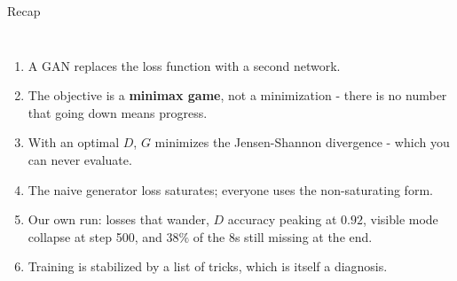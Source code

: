 \documentclass[aspectratio=169]{beamer}
\begin{document}
\begin{frame}{Recap}
  \small
  \begin{columns}[T]
    \begin{enumerate}\setlength\itemsep{2pt}
      \item A GAN replaces the loss function with a second network.
      \item The objective is a \textbf{minimax game}, not a minimization - there is no
        number that going down means progress.
      \item With an optimal $D$, $G$ minimizes the Jensen-Shannon divergence - which you
        can never evaluate.
      \item The naive generator loss saturates; everyone uses the non-saturating form.
      \item Our own run: losses that wander, $D$ accuracy peaking at $0.92$, visible mode
        collapse at step 500, and $38\%$ of the 8s still missing at the end.
      \item Training is stabilized by a list of tricks, which is itself a diagnosis.
    \end{enumerate}
    \vskip 8pt
  \end{columns}
\end{frame}
\end{document}
